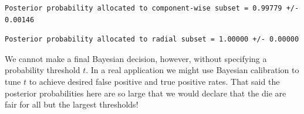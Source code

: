 \documentclass[
  letterpaper,
  DIV=11,
  numbers=noendperiod]{scrartcl}
\newenvironment{Shaded}{\begin{snugshade}}{\end{snugshade}}
\newcommand{\DecValTok}[1]{\textcolor[rgb]{0.68,0.00,0.00}{#1}}
\newcommand{\FunctionTok}[1]{\textcolor[rgb]{0.28,0.35,0.67}{#1}}
\newcommand{\NormalTok}[1]{\textcolor[rgb]{0.00,0.23,0.31}{#1}}
\newcommand{\OtherTok}[1]{\textcolor[rgb]{0.00,0.23,0.31}{#1}}
\newcommand{\SpecialCharTok}[1]{\textcolor[rgb]{0.37,0.37,0.37}{#1}}
\newcommand{\StringTok}[1]{\textcolor[rgb]{0.13,0.47,0.30}{#1}}
\begin{document}
\begin{Shaded}
\end{Shaded}

\begin{verbatim}
Posterior probability allocated to component-wise subset = 0.99779 +/- 0.00146
\end{verbatim}

\begin{Shaded}
\end{Shaded}

\begin{verbatim}
Posterior probability allocated to radial subset = 1.00000 +/- 0.00000
\end{verbatim}

We cannot make a final Bayesian decision, however, without specifying a
probability threshold \(t\). In a real application we might use Bayesian
calibration to tune \(t\) to achieve desired false positive and true
positive rates. That said the posterior probabilities here are so large
that we would declare that the die are fair for all but the largest
thresholds!
\end{document}
